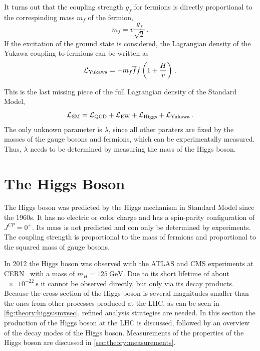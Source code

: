 It turns out that the coupling strength $g_f$ for fermions is directly proportional to the correspinding mass $m_f$ of the fermion,
\begin{equation}
    m_f  = v \frac{g_f}{\sqrt{2}} \,.
\end{equation}
If the excitation of the ground state is considered, the Lagrangian density of the Yukawa coupling to fermions can be written as
\begin{equation}
    \mathcal{L}_\text{Yukawa} = - m_f \overline{f} f \left(1 + \frac{H}{v}\right) \,.
\end{equation}

This is the last missing piece of the full Lagrangian density of the Standard Model,
\begin{equation}
    \mathcal{L}_\text{SM} = \mathcal{L}_\text{QCD} + \mathcal{L}_\text{EW} + \mathcal{L}_\text{Higgs} + \mathcal{L}_\text{Yukawa} \,.
\end{equation}
The only unknown parameter is $\lambda$, since all other paraters are fixed by the masses of the gauge bosons and fermions, which
can be experimentally measured.
Thus, $\lambda$ needs to be determined by measuring the mass of the Higgs boson.

\section{The Higgs Boson}\label{sec:theory:higgs}

The Higgs boson was predicted by the Higgs mechanism in Standard Model since the 1960s.
It has no electric or color charge and has a spin-parity configuration of $J^{CP} = 0^+$.
Its mass is not predicted and con only be determined by experiments.
The coupling strength is proportional to the mass of fermions and proportional to the squared mass of gauge bosons.

In 2012 the Higgs boson was observed with the ATLAS and CMS experiments at CERN~\cite{HiggsDiscoveryATLAS,HiggsDiscoveryCMS} with a
mass of $m_H = \SI{125}{\GeV}$.
Due to its short lifetime of about $\SI{e-22}{\s}$ it cannot be observed directly, but only via its decay products.
Because the cross-section of the Higgs boson is several magnitudes smaller than the ones from other processes produced at the LHC,
as can be seen in \cref{fig:theory:higgs:smxsec}, refined analysis strategies are needed.
In this section the production of the Higgs boson at the LHC is discussed, followed by an overview of the decay modes of the Higgs boson.
Measurements of the properties of the Higgs boson are discussed in \cref{sec:theory:measurements}.

